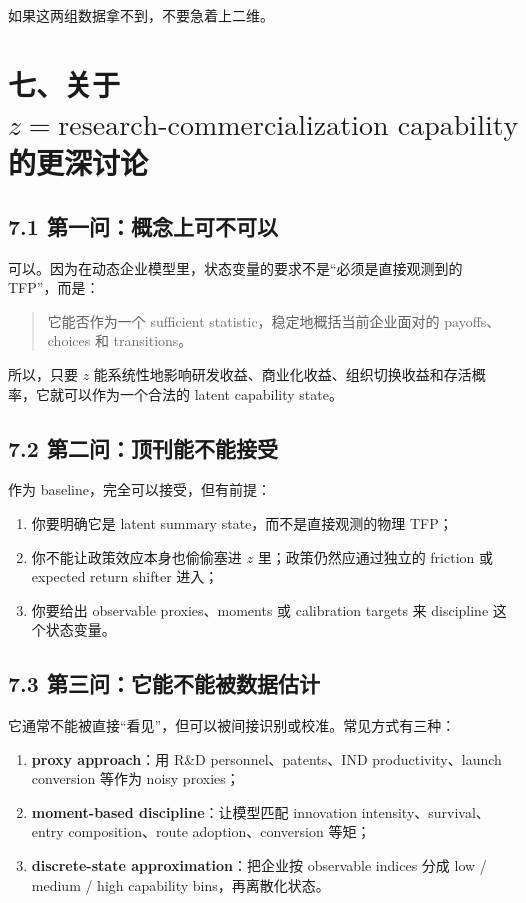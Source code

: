 \documentclass[12pt,fontset=none]{ctexart}
\begin{document}
如果这两组数据拿不到，不要急着上二维。

\section{七、关于 \texorpdfstring{$z=\text{research-commercialization capability}$}{z = research-commercialization capability} 的更深讨论}

\subsection{7.1 第一问：概念上可不可以}

可以。因为在动态企业模型里，状态变量的要求不是“必须是直接观测到的 TFP”，而是：

\begin{quote}
它能否作为一个 sufficient statistic，稳定地概括当前企业面对的 payoffs、choices 和 transitions。
\end{quote}

所以，只要 \(z\) 能系统性地影响研发收益、商业化收益、组织切换收益和存活概率，它就可以作为一个合法的 latent capability state。

\subsection{7.2 第二问：顶刊能不能接受}

作为 baseline，完全可以接受，但有前提：

\begin{enumerate}[leftmargin=2em]
    \item 你要明确它是 latent summary state，而不是直接观测的物理 TFP；
    \item 你不能让政策效应本身也偷偷塞进 \(z\) 里；政策仍然应通过独立的 friction 或 expected return shifter 进入；
    \item 你要给出 observable proxies、moments 或 calibration targets 来 discipline 这个状态变量。
\end{enumerate}

\subsection{7.3 第三问：它能不能被数据估计}

它通常不能被直接“看见”，但可以被间接识别或校准。常见方式有三种：

\begin{enumerate}[leftmargin=2em]
    \item \textbf{proxy approach}：用 R\&D personnel、patents、IND productivity、launch conversion 等作为 noisy proxies；
    \item \textbf{moment-based discipline}：让模型匹配 innovation intensity、survival、entry composition、route adoption、conversion 等矩；
    \item \textbf{discrete-state approximation}：把企业按 observable indices 分成 low / medium / high capability bins，再离散化状态。
\end{enumerate}
\end{document}
